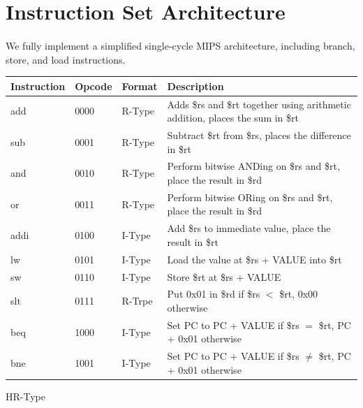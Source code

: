 \documentclass{article}
\newenvironment{problem}[1]{
  \nobreak\section*{#1}
}{}
\begin{document}
  \begin{problem}{Instruction Set Architecture}
    \paragraph{}
    We fully implement a simplified single-cycle MIPS architecture, including 
    branch, store, and load instructions.

    \begin{table}[]
      \begin{tabular}{@{}lllp{6.8cm}@{}}
        \toprule
        Instruction & Opcode & Format & Description \\ \midrule
        add & 0000 & R-Type & Adds \$rs and \$rt together using arithmetic addition, places the sum in \$rt \\
        sub & 0001 & R-Type & Subtract \$rt from \$rs, places the difference in \$rt \\
        and & 0010 & R-Type & Perform bitwise ANDing on \$rs and \$rt, place the result in \$rd \\
        or & 0011 & R-Type & Perform bitwise ORing on \$rs and \$rt, place the result in \$rd \\
        addi & 0100 & I-Type & Add \$rs to immediate value, place the result in \$rt \\
        lw & 0101 & I-Type & Load the value at \$rs + VALUE into \$rt \\
        sw & 0110 & I-Type & Store \$rt at \$rs + VALUE \\
        slt & 0111 & R-Trpe & Put 0x01 in \$rd if \$rs $<$ \$rt, 0x00 otherwise \\
        beq & 1000 & I-Type & Set PC to PC + VALUE if \$rs $=$ \$rt, PC + 0x01 otherwise \\
        bne & 1001 & I-Type & Set PC to PC + VALUE if \$rs $\ne$ \$rt, PC + 0x01 otherwise \\ \bottomrule
      \end{tabular}
    \end{table}
    
    \begin{register}{H}{R-Type}{}
      \begin{center}
      \end{center}
    \end{register}


\end{problem}
\end{document}
